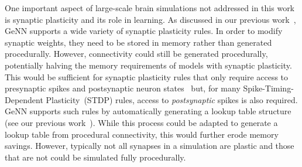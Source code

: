 \documentclass[9pt,twocolumn,twoside,lineno]{pnas-new}
\begin{document}
One important aspect of large-scale brain simulations not addressed in this work is synaptic plasticity and its role in learning.
As discussed in our previous work~\citep{Knight2018}, GeNN supports a wide variety of synaptic plasticity rules.
In order to modify synaptic weights, they need to be stored in memory rather than generated procedurally.
However, connectivity could still be generated procedurally, potentially halving the memory requirements of models with synaptic plasticity.
This would be sufficient for synaptic plasticity rules that only require access to presynaptic spikes and postsynaptic neuron states~\cite{Brader2007,Clopath2010c} but, for many Spike-Timing-Dependent Plasticity~(STDP) rules, access to \emph{postsynaptic} spikes is also required.
GeNN supports such rules by automatically generating a lookup table structure (see our previous work~\citep{Knight2018}).
While this process could be adapted to generate a lookup table from procedural connectivity, this would further erode memory savings.
However, typically not all synapses in a simulation are plastic and those that are not could be simulated fully procedurally.
\end{document}
